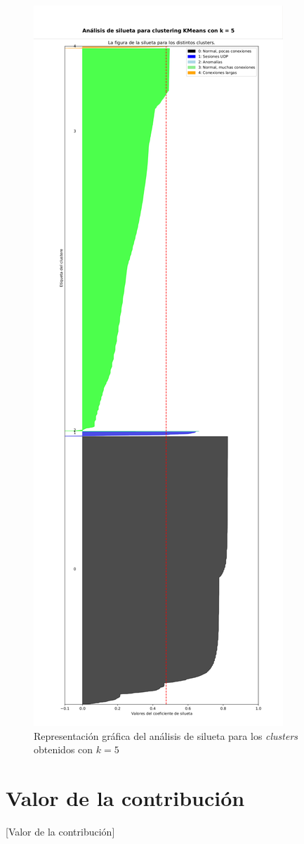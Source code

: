 \begin{figure}[h]
    \centering
    \includegraphics[height=\textheight]{contenido/fig/silhouette_cropped.pdf}
    \caption{Representación gráfica del análisis de silueta para los \emph{clusters} obtenidos con $k=5$}
    \label{fig:silhouette}
\end{figure}

\section{Valor de la contribución}\label{sec:valorcontribución}

[Valor de la contribución]
